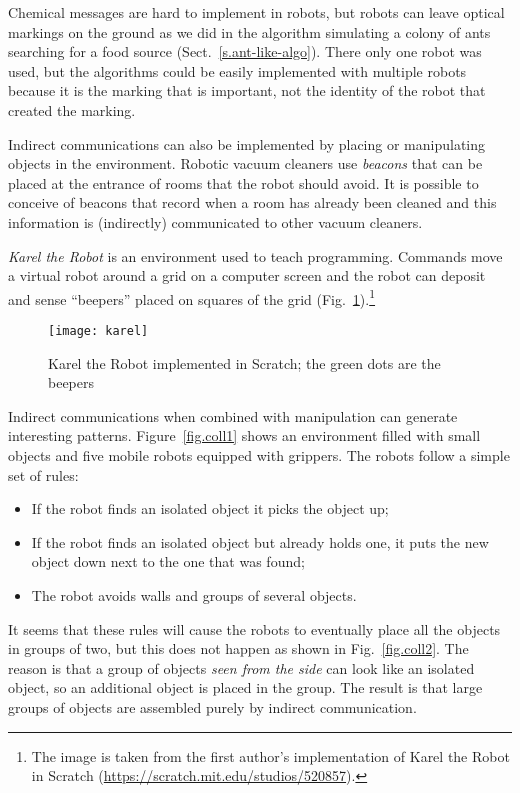 Chemical messages are hard to implement in robots, but robots can leave optical markings on the ground as we did in the algorithm simulating a colony of ants searching for a food source (Sect.~\ref{s.ant-like-algo}). There only one robot was used, but the algorithms could be easily implemented with multiple robots because it is the marking that is important, not the identity of the robot that created the marking.

Indirect communications can also be implemented by placing or manipulating objects in the environment. Robotic vacuum cleaners use \emph{beacons} that can be placed at the entrance of rooms that the robot should avoid. It is possible to conceive of beacons that record when a room has already been cleaned and this information is (indirectly) communicated to other vacuum cleaners.

\emph{Karel the Robot} is an environment used to teach programming. Commands move a virtual robot around a grid on a computer screen and the robot can deposit and sense ``beepers'' placed on squares of the grid (Fig.~\ref{fig.karel}).\footnote{The image is taken from the first author's implementation of Karel the Robot in Scratch (\url{https://scratch.mit.edu/studios/520857}).}

\begin{figure}
\begin{center}
\texttt{[image: karel]}
\end{center}
\caption{Karel the Robot implemented in Scratch; the green dots are the beepers}\label{fig.karel}
\end{figure}

Indirect communications when combined with manipulation can generate interesting patterns. Figure~\ref{fig.coll1} shows an environment filled with small objects and five mobile robots equipped with grippers. The robots follow a simple set of rules:
\begin{itemize}
\item If the robot finds an isolated object it picks the object up;
\item If the robot finds an isolated object but already holds one, it puts the new object down next to the one that was found;
\item The robot avoids walls and groups of several objects.
\end{itemize}
It seems that these rules will cause the robots to eventually place all the objects in groups of two, but this does not happen as shown in Fig.~\ref{fig.coll2}. The reason is that a group of objects \emph{seen from the side} can look like an isolated object, so an additional object is placed in the group. The result is that large groups of objects are assembled purely by indirect communication.

